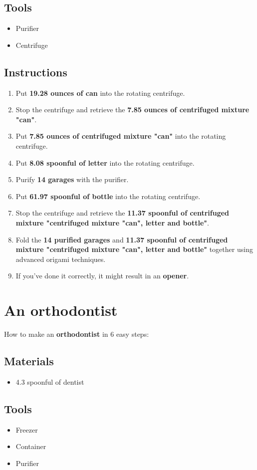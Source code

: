 \documentclass{article}
\begin{document}
\subsection{Tools}\begin{itemize}
\item 
Purifier
\item 
Centrifuge
\end{itemize}
\subsection{Instructions}\begin{enumerate}
\item 
Put \textbf{19.28 ounces of can} into the rotating centrifuge.
\item 
Stop the centrifuge and retrieve the \textbf{7.85 ounces of centrifuged mixture "can"}.
\item 
Put \textbf{7.85 ounces of centrifuged mixture "can"} into the rotating centrifuge.
\item 
Put \textbf{8.08 spoonful of letter} into the rotating centrifuge.
\item 
Purify \textbf{14 garages} with the purifier.
\item 
Put \textbf{61.97 spoonful of bottle} into the rotating centrifuge.
\item 
Stop the centrifuge and retrieve the \textbf{11.37 spoonful of centrifuged mixture "centrifuged mixture "can", letter and bottle"}.
\item 
Fold the \textbf{14 purified garages} and \textbf{11.37 spoonful of centrifuged mixture "centrifuged mixture "can", letter and bottle"} together using advanced origami techniques.
\item 
If you've done it correctly, it might result in an \textbf{opener}.
\end{enumerate}
\newpage
\section{An orthodontist}How to make an \textbf{orthodontist} in 6 easy steps:

\subsection{Materials}\begin{itemize}
\item 
4.3 spoonful of dentist
\end{itemize}
\subsection{Tools}\begin{itemize}
\item 
Freezer
\item 
Container
\item 
Purifier
\end{itemize}
\end{document}
